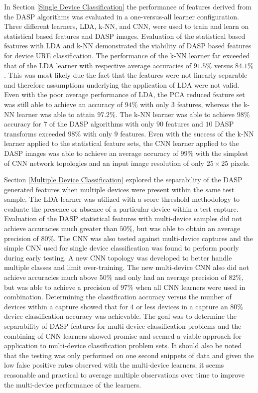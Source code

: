 In Section \ref{Single Device Classification} the performance of features derived from the DASP algorithms was evaluated in a one-versus-all learner configuration.  Three different learners, LDA, k-NN, and CNN, were used to train and learn on statistical based features and DASP images.  Evaluation of the statistical based features with LDA and k-NN demonstrated the viability of DASP based features for device URE classification.  The performance of the k-NN learner far exceeded that of the LDA learner with respective average accuracies of $91.5\%$ versus $84.1\%$.  This was most likely due the fact that the features were not linearly separable and therefore assumptions underlying the application of LDA were not valid.  Even with the poor average performance of LDA, the PCA reduced feature set was still able to achieve an accuracy of $94\%$ with only $3$ features, whereas the k-NN learner was able to attain $97.2\%$.  The k-NN learner was able to achieve $98\%$ accuracy for $7$ of the DASP algorithms with only $90$ features and $10$ DASP transforms exceeded $98\%$ with only $9$ features.  Even with the success of the k-NN learner applied to the statistical feature sets, the CNN learner applied to the DASP images was able to achieve an average accuracy of $99\%$ with the simplest of CNN network topologies and an input image resolution of only $25 \times 25$ pixels.

Section \ref{Multiple Device Classification} explored the separability of the DASP generated features when multiple devices were present within the same test sample.  The LDA learner was utilized with a score threshold methodology to evaluate the presence or absence of a particular device within a test capture.  Evaluation of the DASP statistical features with multi-device samples did not achieve accuracies much greater than $50\%$, but was able to obtain an average precision of $80\%$.  The CNN was also tested against multi-device captures and the simple CNN used for single device classification was found to perform poorly during early testing.  A new CNN topology was developed to better handle multiple classes and limit over-training.  The new multi-device CNN also did not achieve accuracies much above $50\%$ and only had an average precision of $82\%$, but was able to achieve a precision of $97\%$ when all CNN learners were used in combination.  Determining the classification accuracy versus the number of devices within a capture showed that for $4$ or less devices in a capture an $80\%$ device classification accuracy was achievable.  The goal was to determine the separability of DASP features for multi-device classification problems and the combining of CNN learners showed promise and seemed a viable approach for application to multi-device classification problem sets.  It should also be noted that the testing was only performed on one second snippets of data and given the low false positive rates observed with the multi-device learners, it seems reasonable and practical to average multiple observations over time to improve the multi-device performance of the learners.

